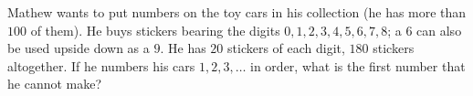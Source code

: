 Mathew wants to put numbers on the toy cars in his collection (he has more than $100$ of them). He buys stickers bearing the digits $0,1,2,3,4,5,6,7,8$; a $6$ can also be used upside down as a $9$. He has $20$ stickers of each digit, $180$ stickers altogether. If he numbers his cars $1,2,3,\dots$ in order, what is the first number that he cannot make?
